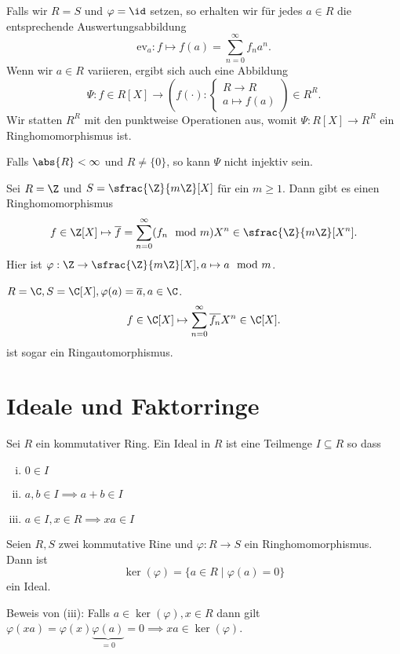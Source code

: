 \begin{eg}
	Falls wir $R = S$ und $\varphi = \id$ setzen, so erhalten wir für jedes $a \in R$ die entsprechende Auswertungsabbildung
	\[
		\text{ev}_{a} : f \mapsto f(a) = \sum_{n=0}^{\infty} f_{n} a^{n}
	.\] 
	Wenn wir $a \in R$ variieren, ergibt sich auch eine Abbildung
	\[
		\Psi: f \in R[X] \to \left(f(\cdot): \begin{cases}
			R \to R\\
			a \mapsto f(a)
		\end{cases}\right) \in R^{R}
	.\]
	Wir statten $R^{R}$ mit den punktweise Operationen aus, womit $\Psi: R[X] \to R^{R}$ ein Ringhomomorphismus ist.
	
	Falls $\abs{R} < \infty$ und $R \neq \{0\}$, so kann $\Psi$ nicht injektiv sein. 
\end{eg}

\begin{eg}
	Sei $R = \Z$ und $S = \sfrac{\Z}{m\Z}[X]$ für ein $m \geq 1$.
	Dann gibt es einen Ringhomomorphismus
	\[
		f \in \Z[X] \mapsto \overline{f} = \sum_{n=0}^{\infty} (f_{n} \mod m) X^{n} \in \sfrac{\Z}{m\Z}[X^{n}]
	.\]
	Hier ist $\varphi: \Z \to \sfrac{\Z}{m\Z} [X], a \mapsto a \mod m$.
\end{eg}

\begin{eg}
	$R = \C, S = \C[X], \varphi(a) = \overline{a}, a \in \C$.
	\[
		f \in \C[X] \mapsto \sum_{n=0}^{\infty} \overline{f_{n}} X^{n} \in \C[X]
	.\] 
	ist sogar ein Ringautomorphismus.
\end{eg}

\section{Ideale und Faktorringe}

\begin{definition}
	Sei $R$ ein kommutativer Ring.
	Ein Ideal in $R$ ist eine Teilmenge $I \subseteq R$ so dass
	\begin{enumerate}[(i)]
		\item $0 \in I$ 
		\item $a,b \in I \implies a + b \in I$
		\item $a \in I, x \in R \implies xa \in I$
	\end{enumerate}
\end{definition}

\begin{eg}
	Seien $R,S$ zwei kommutative Rine und $\varphi: R \to S$ ein Ringhomomorphismus. Dann ist
	\[
		\ker(\varphi) = \{a \in R \mid \varphi(a) = 0\} 
	\] 
	ein Ideal.

	Beweis von (iii): Falls $a \in \ker(\varphi), x \in R$ dann gilt $\varphi(xa) = \varphi(x) \underbrace{\varphi(a)}_{=0} = 0 \implies  xa \in \ker(\varphi)$.
\end{eg}

